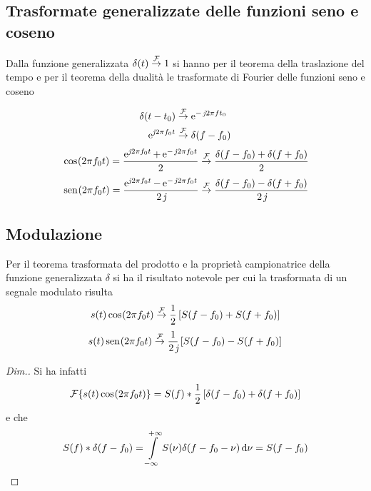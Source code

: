 \subsection{Trasformate generalizzate delle funzioni seno e coseno}
Dalla funzione generalizzata $\delta(t)\overset{\operatorname{\mathcal{F}}}{\rightarrow}1$ si hanno per il teorema della traslazione del tempo e per il teorema della dualità le trasformate di Fourier delle funzioni seno e coseno

\begin{align*}
	\delta(t-t_0)&\overset{\operatorname{\mathcal{F}}}{\to}\operatorname{e}^{-\operatorname{\mathit{j}\!} 2\pi f t_0}\\
	\operatorname{e}^{\operatorname{\mathit{j}\!} 2\pi f_0 t}&\overset{\operatorname{\mathcal{F}}}{\to}\delta(f-f_0)
\end{align*}
\begin{equation}
	\,{\operatorname{cos}}^{}\!\left({2\pi f_0 t}\right)=\frac{\operatorname{e}^{\operatorname{\mathit{j}\!} 2\pi f_0 t}+\operatorname{e}^{-\operatorname{\mathit{j}\!} 2\pi f_0 t}}{2}\overset{\operatorname{\mathcal{F}}}{\to}\frac{\delta(f-f_0)+\delta(f+f_0)}{2}
\end{equation}
\begin{equation}
	\,{\operatorname{sen}}^{}\!\left({2\pi f_0 t}\right)=\frac{\operatorname{e}^{\operatorname{\mathit{j}\!} 2\pi f_0 t}-\operatorname{e}^{-\operatorname{\mathit{j}\!} 2\pi f_0 t}}{2\operatorname{\mathit{j}\!}}\overset{\operatorname{\mathcal{F}}}{\to}\frac{\delta(f-f_0)-\delta(f+f_0)}{2\operatorname{\mathit{j}\!}}
\end{equation}

\subsection{Modulazione}
Per il teorema trasformata del prodotto e la proprietà campionatrice della funzione generalizzata $\delta$ si ha il risultato notevole per cui la trasformata di un segnale modulato risulta
\begin{equation}
\label{eq:fourier_modulazione_coseno}
	s(t)\,{\operatorname{cos}}^{}\!\left({2\pi f_0 t}\right)\overset{\operatorname{\mathcal{F}}}{\to}\frac{1}{2}\left[S(f-f_0)+S(f+f_0)\right]
\end{equation}
\begin{equation}
	s(t)\,{\operatorname{sen}}^{}\!\left({2\pi f_0 t}\right)\overset{\operatorname{\mathcal{F}}}{\to}\frac{1}{2\operatorname{\mathit{j}\!}}\left[S(f-f_0)-S(f+f_0)\right]
\end{equation}

\begin{proof}[Dim.]
Si ha infatti
\[
	\operatorname{\mathcal{F}}\!\left\lbrace{s(t)\,{\operatorname{cos}}^{}\!\left({2\pi f_0 t}\right)}\right\rbrace=S(f)\ast\frac{1}{2}\left[\delta(f-f_0)+\delta(f+f_0)\right]
\]
e che 
\[
	S(f)\ast\delta(f-f_0)=\int\limits_{-\infty}^{+\infty}{S(\nu)\delta(f-f_0-\nu)}{\,\mathop{}\!\mathrm{d}{\nu}}=S(f-f_0)
\qedhere
\]
\end{proof}

